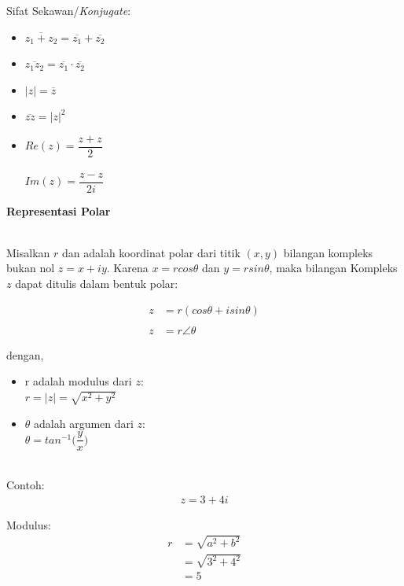 \documentclass{article}
\begin{document}
Sifat Sekawan/\textit{Konjugate}:
\begin{itemize}
    \item $\overline{z_1 + z_2} = \overline{z_1} + \overline{z_2}$
    \item $\overline{z_1 z_2} = \overline{z_1} \cdot \overline{z_2}$
    \item $|z| = \overline{z}$
    \item $\overline{zz} = |z|^2$
    \item $Re(z) = \dfrac{z+z}{2}$\\ \\
          $Im(z) = \dfrac{z-z}{2i}$
\end{itemize}



\newpage
\begin{center}
    \textbf{Representasi Polar}
\end{center}
\leavevmode\\

Misalkan $r$ dan adalah koordinat polar dari titik $(x, y)$ bilangan kompleks bukan nol $z = x + iy$. Karena $x = r cos \theta $ dan $y = r sin \theta$, maka bilangan Kompleks $z$ dapat
ditulis dalam bentuk polar:

\begin{align}
    z & = r(cos \theta + i sin \theta)
    \nonumber                          \\
    \nonumber                          \\
    z & = r \angle \theta
    \nonumber
\end{align}

dengan,
\begin{itemize}
    \item r adalah modulus dari $z$:\\
          $ r = |z| = \sqrt{x^2+y^2} $
    \item $\theta$ adalah argumen dari $z$:\\
          $ \theta = tan^{-1} \bigg(\dfrac{y}{x}\bigg) $
\end{itemize}
\leavevmode\\

Contoh:
\begin{align}
    z = 3 + 4i \nonumber
\end{align}

Modulus:
\begin{align}
    r & = \sqrt{a^2 + b^2}
    \nonumber              \\
      & = \sqrt{3^2 + 4^2}
    \nonumber              \\
      & = 5
    \nonumber
\end{align}
\end{document}
